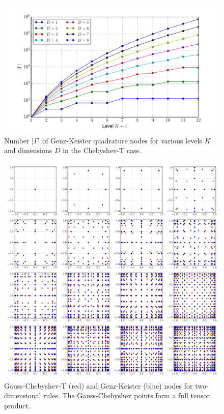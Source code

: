 \documentclass[a4paper,10pt]{article}
\begin{document}
\begin{figure}
  \centering
  \includegraphics[width=\linewidth]{./img/number_nodes_levdim_chebyshevt.pdf}
  \caption{Number $|\Gamma|$ of Genz-Keister quadrature nodes for various
  levels $K$ and dimensions $D$ in the Chebyshev-T case.}
  \label{fig:number_nodes_levdim_chebyshevt}
\end{figure}

\begin{figure}[h]
  \centering
  \includegraphics[width=\linewidth]{./img/gk_chebyshevt_nodes_2d.pdf}
  \caption{Gauss-Chebyshev-T (red) and Genz-Keister (blue) nodes for
  two-dimensional rules. The Gauss-Chebyshev points form a full tensor
  product.}
  \label{fig:gk_chebyshevt_nodes_2d}
\end{figure}
\end{document}
